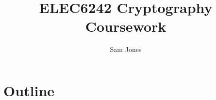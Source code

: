 \documentclass{article}
\title{ELEC6242 Cryptography Coursework}
\author{Sam Jones}
\begin{document}
\maketitle

\tableofcontents

\section{Outline}





\end{document}
